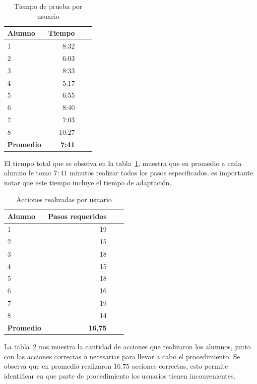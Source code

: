 \begin{table}[!hbt]
\centering
\begin{tabular}{lrrr}
\toprule
\textbf{Alumno} & \textbf{Tiempo} \\
\midrule
1        & 8:32 \\
2        & 6:03 \\
3        & 8:33 \\
4        & 5:17 \\
5        & 6:55 \\
6        & 8:40 \\
7        & 7:03 \\
8        & 10:27 \\
\midrule
\textbf{Promedio} & \textbf{7:41} \\
\bottomrule
\end{tabular}
\caption{Tiempo de prueba por usuario}
\label{tab:interfaz_tiempo_total}
\end{table}

El tiempo total que se observa en la tabla~\ref{tab:interfaz_tiempo_total},
muestra que en promedio a cada alumno le tomo $7:41$ minutos realizar todos los
pasos especificados, es importante notar que este tiempo incluye el tiempo de
adaptación. 



\begin{table}[!hbt]
\centering
\begin{tabular}{lrrr}
\toprule
\textbf{Alumno} & \textbf{Pasos requeridos} \\
\midrule
1 & 19 \\
2 & 15 \\
3 & 18 \\
4 & 15 \\
5 & 18 \\
6 & 16 \\
7 & 19 \\
8 & 14 \\
\midrule
\textbf{Promedio} & \textbf{16,75} \\
\bottomrule
\end{tabular}
\caption{Acciones realizadas por usuario}
\label{tab:interfaz_acciones}
\end{table}

La tabla~\ref{tab:interfaz_acciones} nos muestra la cantidad de acciones que
realizaron los alumnos, junto con las acciones correctas o necesarias para
llevar a cabo el procedimiento. Se observa que en promedio realizaron $16.75$
acciones correctas, esto permite identificar en que parte de procedimiento los
usuarios tienen inconvenientes.

